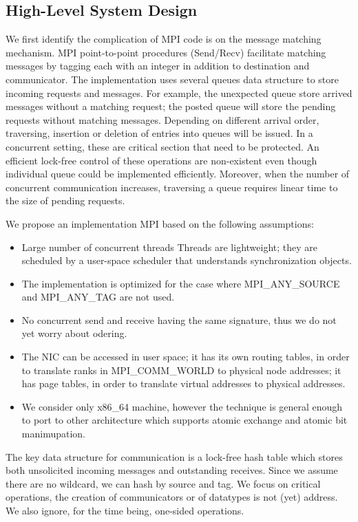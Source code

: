 \subsection{High-Level System Design}
We first identify the complication of MPI code is on the message matching
mechanism. MPI point-to-point procedures (Send/Recv) facilitate matching
messages by tagging each with an integer in addition to destination and
communicator. The implementation uses several queues data structure to store
incoming requests and messages. For example, the unexpected queue store arrived
messages without a matching request; the posted queue will store the pending
requests without matching messages. Depending on different arrival order,
traversing, insertion or deletion of entries into queues will be issued. In a
concurrent setting, these are critical section that need to be protected. An
efficient lock-free control of these operations are non-existent even though
individual queue could be implemented efficiently.  Moreover, when the number
of concurrent communication increases, traversing a queue requires linear time
to the size of pending requests.

We propose an implementation MPI based on the following assumptions:
\begin{itemize}
  \item Large number of concurrent threads Threads are lightweight; they are
    scheduled by a user-space scheduler that understands synchronization
    objects.
  \item The implementation is optimized for the case where MPI_ANY_SOURCE and MPI_ANY_TAG are not used.
  \item No concurrent send and receive having the same signature, thus we do not yet worry about odering.
  \item The NIC can be accessed in user space; it has its own routing tables,
    in order to translate ranks in MPI\_COMM\_WORLD to physical node addresses;
    it has page tables, in order to translate virtual addresses to physical
    addresses.
  \item We consider only x86_64 machine, however the technique is general
    enough to port to other architecture which supports atomic exchange and
    atomic bit manimupation.
\end{itemize}

The key data structure for communication is a lock-free hash table which stores
both unsolicited incoming messages and outstanding receives. Since we assume
there are no wildcard, we can hash by source and tag. We focus on critical
operations, the creation of communicators or of datatypes is not (yet)
address. We also ignore, for the time being, one-sided operations.

